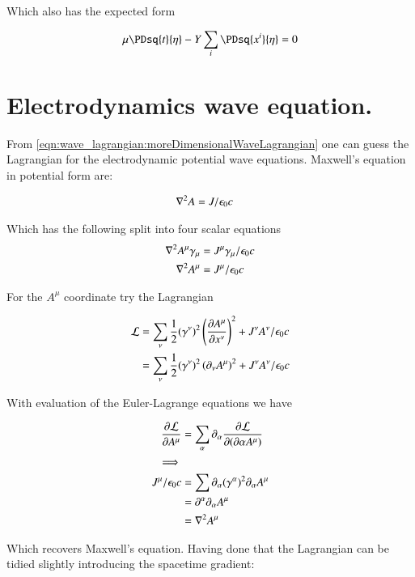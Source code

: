 Which also has the expected form

\begin{align*}
\mu \PDsq{t}{\eta} - Y \sum_i \PDsq{x^i}{\eta} &= 0 \\
\end{align*}

\section{Electrodynamics wave equation. }

From \ref{eqn:wave_lagrangian:moreDimensionalWaveLagrangian} one can guess the Lagrangian for the electrodynamic potential wave equations.  Maxwell's equation in potential form are:

\begin{align}\label{eqn:wave_lagrangian:maxwellPotential}
\grad^2 A &= J/\epsilon_0 c
\end{align}

Which has the following split into four scalar equations
\begin{align*}
\grad^2 A^\mu \gamma_\mu &= J^\mu \gamma_\mu/\epsilon_0 c \\
\grad^2 A^\mu &= J^\mu /\epsilon_0 c
\end{align*}

For the $A^\mu$ coordinate try the Lagrangian

\begin{align*}
\LL 
&= \sum_\nu \inv{2} (\gamma^\nu)^2 \left( \PD{x^\nu}{A^\mu} \right)^2 + J^\nu A^\nu / \epsilon_0 c \\
&= \sum_\nu \inv{2} (\gamma^\nu)^2 \left(\partial_{\nu}{A^\mu}\right)^2 + J^\nu A^\nu / \epsilon_0 c \\
\end{align*}

With evaluation of the Euler-Lagrange equations we have

\begin{align*}
\PD{A^\mu}{\LL} &= \sum_\alpha \partial_{\alpha} \PD{(\partial{\alpha}{A^\mu})}{\LL} \\
\implies \\
J^\mu/\epsilon_0 c
&= \sum \partial_\alpha (\gamma^\alpha)^2 \partial_{\alpha}{A^\mu} \\
&= \partial^\alpha \partial_{\alpha}{A^\mu} \\
&= \grad^2 A^\mu \\
\end{align*}

Which recovers Maxwell's equation.  Having done that the Lagrangian can be tidied slightly introducing the spacetime gradient:

